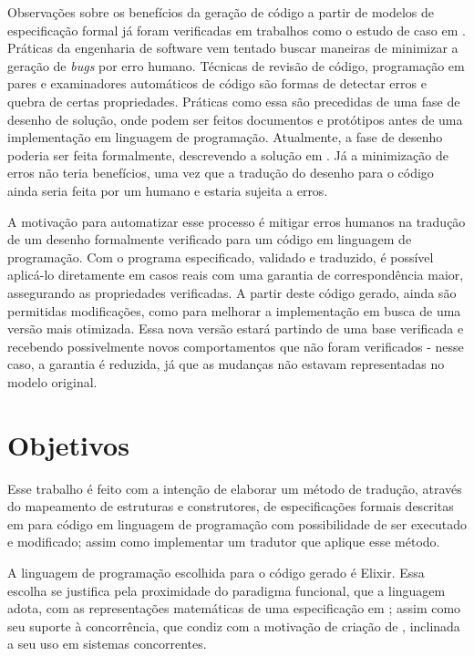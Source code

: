 Observações sobre os benefícios da geração de código a partir de modelos de especificação formal já foram verificadas em trabalhos como o estudo de caso em \cite{Leonard2008}. Práticas da engenharia de software vem tentado buscar maneiras de minimizar a geração de \textit{bugs} por erro humano. Técnicas de revisão de código, programação em pares e examinadores automáticos de código são formas de detectar erros e quebra de certas propriedades. Práticas como essa são precedidas de uma fase de desenho de solução, onde podem ser feitos documentos e protótipos antes de uma implementação em linguagem de programação. Atualmente, a fase de desenho poderia ser feita formalmente, descrevendo a solução em \TLAA. Já a minimização de erros não teria benefícios, uma vez que a tradução do desenho para o código ainda seria feita por um humano e estaria sujeita a erros.

A motivação para automatizar esse processo é mitigar erros humanos na
tra\-du\-ção de um desenho formalmente verificado para um código em linguagem de
programação. Com o programa especificado, validado e traduzido, é possível
aplicá-lo diretamente em casos reais com uma garantia de correspondência maior,
assegurando as propriedades verificadas. A partir deste código gerado, ainda são
permitidas modificações, como para melhorar a implementação em busca de uma
versão mais otimizada. Essa nova versão estará partindo de uma base verificada e
recebendo possivelmente novos comportamentos que não foram verificados - nesse
caso, a garantia é reduzida, já que as mudanças não estavam representadas no
modelo original.

\section{Objetivos}

Esse trabalho é feito com a intenção de elaborar um método de tradução, através do mapeamento de estruturas e construtores, de especificações formais descritas em \TLA para código em linguagem de programação com possibilidade de ser executado e modificado; assim como implementar um tradutor que aplique esse método.

A linguagem de programação escolhida para o código gerado é Elixir. Essa escolha
se justifica pela proximidade do paradigma funcional, que a linguagem adota, com
as representações matemáticas de uma especificação em \TLAA; assim como seu
suporte à concorrência, que condiz com a motivação de criação de \TLAA,
inclinada a seu uso em sistemas concorrentes.

